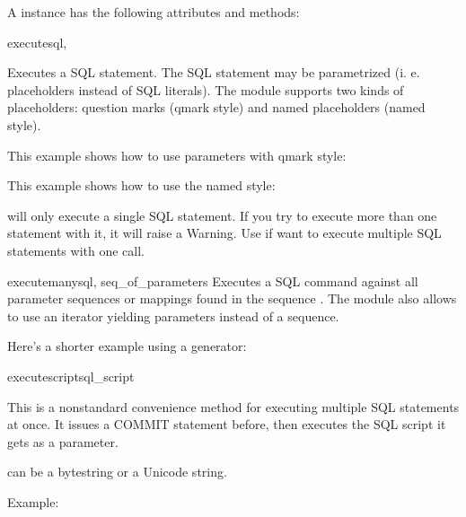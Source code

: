 A  instance has the following attributes and methods:

\begin{methoddesc}{execute}{sql, }

Executes a SQL statement. The SQL statement may be parametrized (i. e.
placeholders instead of SQL literals). The  module supports two kinds of
placeholders: question marks (qmark style) and named placeholders (named
style).

This example shows how to use parameters with qmark style:

    

This example shows how to use the named style:

    

     will only execute a single SQL statement. If you try to
    execute more than one statement with it, it will raise a Warning. Use
     if want to execute multiple SQL statements with one
    call.
\end{methoddesc}


\begin{methoddesc}{executemany}{sql, seq_of_parameters}
Executes a SQL command against all parameter sequences or mappings found in the
sequence . The  module also allows
to use an iterator yielding parameters instead of a sequence.



Here's a shorter example using a generator:


\end{methoddesc}

\begin{methoddesc}{executescript}{sql_script}

This is a nonstandard convenience method for executing multiple SQL statements
at once. It issues a COMMIT statement before, then executes the SQL script it
gets as a parameter.

 can be a bytestring or a Unicode string.

Example:


\end{methoddesc}

